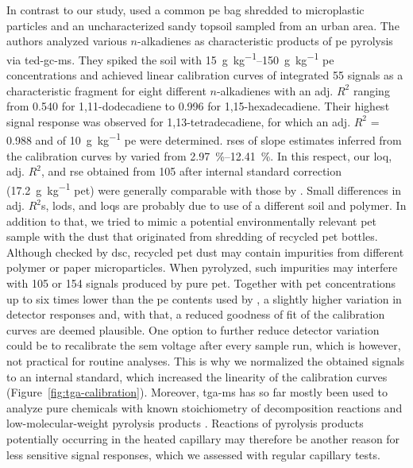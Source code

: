 In contrast to our study, \citet{DumichenFast2017} used a common \ac{pe} bag shredded to microplastic particles and an uncharacterized sandy topsoil sampled from an urban area. The authors analyzed various $n$-alkadienes as characteristic products of \ac{pe} pyrolysis via \ac{ted-gc-ms}. They spiked the soil with \SIrange[range-phrase = { to }]{15}{150}{\gram\per\kilo\gram} \ac{pe} concentrations and achieved linear calibration curves of integrated \SI{55}{\mz} signals as a characteristic fragment for eight different $n$-alkadienes with an adj. $R^2$ ranging from \num{0.540} for 1,11-dodecadiene to \num{0.996} for 1,15-hexadecadiene. Their highest signal response was observed for 1,13-tetradecadiene, for which an adj. $R^2$ = \num{0.988} and  of \SI{10}{\gram\per\kilo\gram} \ac{pe} were determined.
\Acp{rse} of slope estimates inferred from the calibration curves by \citet{DumichenAnalysis2015} varied from \SIrange[range-phrase = { to }]{2.97}{12.41}{\percent}. In this respect, our \ac{loq}, adj. $R^2$, and \ac{rse} obtained from \SI{105}{\mz} after internal standard correction (\SI{17.2}{\gram\per\kilo\gram} \ac{pet}) were generally comparable with those by \citet{DumichenAnalysis2015}.
Small differences in adj. $R^2$s, \acp{lod}, and \acp{loq} are probably due to use of a different soil and polymer. In addition to that, we tried to mimic a potential environmentally relevant \ac{pet} sample with the dust that originated from shredding of recycled \ac{pet} bottles.
Although checked by \ac{dsc}, recycled \ac{pet} dust may contain impurities from different polymer or paper microparticles.
When pyrolyzed, such impurities may interfere with \num{105} or \SI{154}{\mz} signals produced by pure \ac{pet}.
Together with \ac{pet} concentrations up to six times lower than the \ac{pe} contents used by \citet{DumichenAnalysis2015}, a slightly higher variation in detector responses and, with that, a reduced goodness of fit of the calibration curves are deemed plausible. One option to further reduce detector variation could be to recalibrate the \ac{sem} voltage after every sample run, which is however, not practical for routine analyses. This is why we normalized the obtained signals to an internal standard, which increased the linearity of the calibration curves (Figure~\ref{fig:tga-calibration}).
Moreover, \ac{tga-ms} has so far mostly been used to analyze pure chemicals with known stoichiometry of decomposition reactions and low-molecular-weight pyrolysis products \citep{HotovaQuantitative2016}. Reactions of pyrolysis products potentially occurring in the heated capillary may therefore be another reason for less sensitive signal responses, which we assessed with regular capillary tests.


